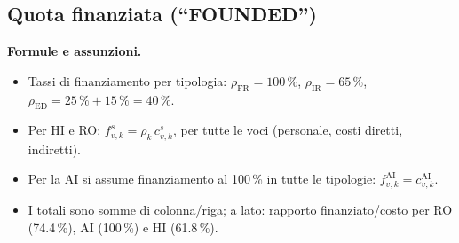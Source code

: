 \documentclass{plan4ari_report}
\newcommand{\FR}{\mathrm{FR}}
\newcommand{\IR}{\mathrm{IR}}
\newcommand{\ED}{\mathrm{ED}}
\begin{document}
\subsection{Quota finanziata (``FOUNDED'')}
\textbf{Formule e assunzioni.}
\begin{itemize}
  \item Tassi di finanziamento per tipologia: $\rho_{\FR} = 100\,\%$, $\rho_{\IR} = 65\,\%$, $\rho_{\ED} = 25\,\% + 15\,\% = 40\,\%$.
  \item Per HI e RO: $f^{s}_{v,k} = \rho_k \, c^{s}_{v,k}$, per tutte le voci (personale, costi diretti, indiretti).
  \item Per la AI si assume finanziamento al 100\,\% in tutte le tipologie: $f^{\mathrm{AI}}_{v,k} = c^{\mathrm{AI}}_{v,k}$.
  \item I totali sono somme di colonna/riga; a lato: rapporto finanziato/costo per RO (74.4\,\%), AI (100\,\%) e HI (61.8\,\%).
\end{itemize}
\end{document}
